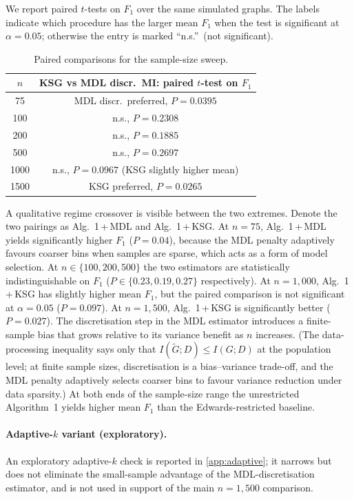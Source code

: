 We report paired $t$-tests on $F_1$ over the same simulated graphs.
The labels indicate which procedure has the larger mean $F_1$ when the
test is significant at $\alpha = 0.05$; otherwise the entry is marked
``n.s.''\ (not significant).

\begin{table}[ht]
\centering
\caption{Paired comparisons for the sample-size sweep.}
\label{tab:suzuki_ttest}
\small
\begin{tabular}{cc}
\toprule
$n$ & KSG vs MDL discr.\ MI: paired $t$-test on $F_1$ \\
\midrule
75    & MDL discr.\ preferred, $P = 0.0395$ \\
100   & n.s., $P = 0.2308$ \\
200   & n.s., $P = 0.1885$ \\
500   & n.s., $P = 0.2697$ \\
1000  & n.s., $P = 0.0967$ (KSG slightly higher mean) \\
1500  & KSG preferred, $P = 0.0265$ \\
\bottomrule
\end{tabular}
\end{table}

A qualitative regime crossover is visible between the two
extremes. Denote the two pairings as Alg.~1\,+\,MDL and
Alg.~1\,+\,KSG. At $n = 75$, Alg.~1\,+\,MDL yields significantly
higher $F_1$ ($P = 0.04$), because the MDL penalty adaptively
favours coarser bins when samples are sparse, which acts as a
form of model selection. At $n \in \{100, 200, 500\}$ the two
estimators are statistically indistinguishable on $F_1$
($P \in \{0.23, 0.19, 0.27\}$ respectively). At $n = 1{,}000$,
Alg.~1\,+\,KSG has slightly higher mean $F_1$, but the paired
comparison is not significant at $\alpha = 0.05$ ($P = 0.097$).
At $n = 1{,}500$, Alg.~1\,+\,KSG is significantly better
($P = 0.027$). The discretisation step in the MDL estimator
introduces a finite-sample bias that grows relative to its
variance benefit as $n$ increases. (The
data-processing inequality says only that
$I(\tilde G; D) \le I(G; D)$ at the population level; at finite
sample sizes, discretisation is a bias--variance trade-off, and the
MDL penalty adaptively selects coarser bins to favour variance
reduction under data sparsity.) At both ends of the sample-size
range the unrestricted Algorithm~1 yields higher mean $F_1$ than the
Edwards-restricted baseline.

\paragraph{\texorpdfstring{Adaptive-$k$ variant (exploratory).}{Adaptive-k variant (exploratory).}}
An exploratory adaptive-$k$ check is reported in
\cref{app:adaptive}; it narrows but does not eliminate the
small-sample advantage of the MDL-discretisation estimator, and
is not used in support of the main $n = 1{,}500$ comparison.

